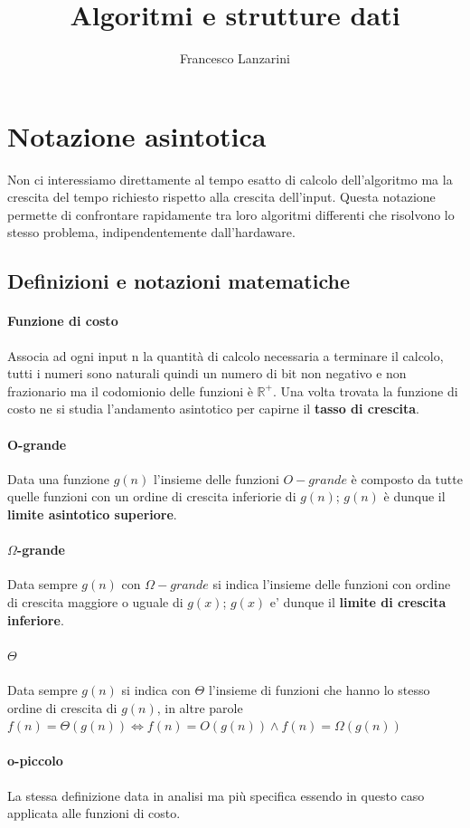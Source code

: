 \documentclass{article}
\title{Algoritmi e strutture dati}
\author{Francesco Lanzarini}
\date{ }
\begin{document}
\maketitle

\section{Notazione asintotica}
Non ci interessiamo direttamente al tempo esatto di calcolo dell'algoritmo ma la crescita del tempo richiesto rispetto alla crescita dell'input. 
Questa notazione permette di confrontare rapidamente tra loro algoritmi differenti che risolvono lo stesso problema, indipendentemente dall'hardaware.
\subsection{Definizioni e notazioni matematiche}
\paragraph{Funzione di costo}
Associa ad ogni input n la quantità di calcolo necessaria a terminare il calcolo, tutti i numeri sono naturali quindi un numero di bit non negativo e non frazionario ma il codomionio delle funzioni è $\mathbb{R}^+$.
Una volta trovata la funzione di costo ne si studia l'andamento asintotico per capirne il \textbf{tasso di crescita}.
\paragraph{O-grande}
Data una funzione $g(n)$ l'insieme delle funzioni $O-grande$ è composto da tutte quelle funzioni con un ordine di crescita inferiorie di $g(n)$; $g(n)$ è dunque il \textbf{limite asintotico superiore}.
\paragraph{$\Omega$-grande}
Data sempre $g(n)$ con $\Omega-grande$ si indica l'insieme delle funzioni con ordine di crescita maggiore o uguale di $g(x)$; $g(x)$ e' dunque il \textbf{limite di crescita inferiore}.
\paragraph{$\Theta$}
Data sempre $g(n)$ si indica con $\Theta$ l'insieme di funzioni che hanno lo stesso ordine di crescita di $g(n)$, 
in altre parole $f(n) = \Theta(g(n)) \iff f(n) = O(g(n)) \land f(n) = \Omega(g(n))$
\paragraph{o-piccolo} La stessa definizione data in analisi ma più specifica essendo in questo caso applicata alle funzioni di costo.
\end{document}
